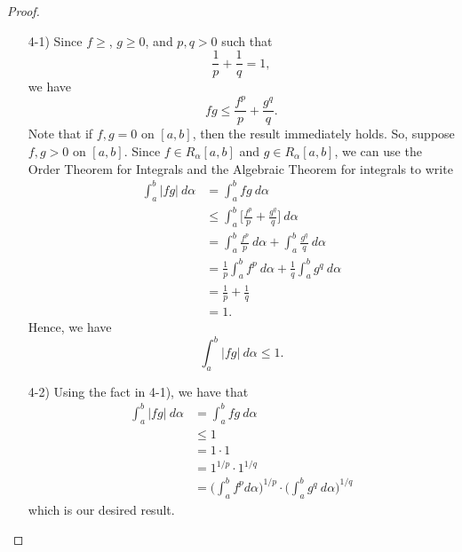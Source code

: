 \documentclass[a4paper]{article}
\begin{document}
\begin{proof}
\begin{enumerate}
    \item[4-1)] Since \( f \geq  \), \( g \geq 0  \), and \( p,q > 0  \) such that 
        \[  \frac{ 1 }{ p }  + \frac{ 1 }{ q }  = 1,  \]
        we have 
        \[  fg \leq \frac{ f^{p} }{ p  }  + \frac{ g^{q} }{ q }. \]
        Note that if \( f, g = 0  \) on \( [a,b] \), then the result immediately holds. So, suppose \( f,g > 0  \) on \( [a,b] \).
        Since \( f \in {R}_{\alpha}[a,b] \) and \( g \in {R}_{\alpha}[a,b] \), we can use the Order Theorem for Integrals and the Algebraic Theorem for integrals to write
        \begin{align*}
            \int_{ a }^{ b }  | fg |    \ d \alpha &= \int_{ a }^{ b } fg  \ d \alpha \tag{\( fg > 0  \)} \\
            &\leq \int_{ a }^{ b } \Big[ \frac{ f^{p} }{ p }  + \frac{ g^{q} }{ q  } \Big] \ d \alpha \\
                                          &= \int_{ a }^{ b }  \frac{ f^{p} }{ p }  \ d \alpha + \int_{ a }^{ b }  \frac{ g^{q} }{ q }  \ d \alpha  \\
                                          &= \frac{ 1 }{ p }  \int_{ a }^{ b } f^{p}   \ d \alpha + \frac{ 1 }{ q }  \int_{ a }^{ b } g^{q} \ d \alpha \\
                                        &= \frac{ 1 }{ p } + \frac{ 1 }{ q } \\ 
                                        &= 1.
        \end{align*}
        Hence, we have 
        \[  \int_{ a }^{ b } | fg |    \ d \alpha \leq 1.  \]
    \item[4-2)] Using the fact in 4-1), we have that 
        \begin{align*}
            \int_{ a }^{ b } | fg |  \ d \alpha &= \int_{ a }^{ b } fg  \ d \alpha  \\
                                                &\leq 1 \\
                                                &= 1 \cdot 1 \\
                                                &= 1^{1/p} \cdot 1^{1/q} \\
                                                &= \Big(  \int_{ a }^{ b } f^{p} d \alpha \Big)^{1/p} \cdot \Big(  \int_{ a }^{ b } g^{q} \ d \alpha \Big)^{1/q}
        \end{align*}
        which is our desired result.
\end{enumerate}
\end{proof}
\end{document}
